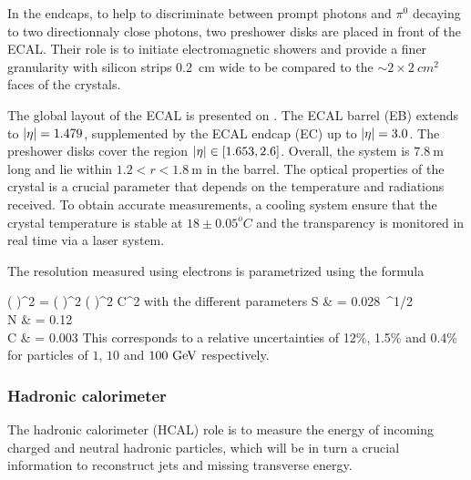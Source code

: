         In the endcaps, to help to discriminate between prompt photons and $\pi^0$ decaying
        to two directionnaly close photons, two preshower disks are placed in front of the
        ECAL. Their role is to initiate electromagnetic showers and provide a finer granularity
        with silicon strips 0.2~cm wide to be compared to the $\sim2\times2~cm^2$ faces
        of the crystals.


        The global layout of the ECAL is presented on . The ECAL
        barrel (EB) extends to $\left| \eta \right| = 1.479$, supplemented by the ECAL endcap (EC)
        up to $\left| \eta \right| = 3.0$. The preshower disks cover the region $\left| \eta \right| \in [1.653,2.6]$.
        Overall, the system is $7.8~\text{m}$ long and lie within $1.2 < r < 1.8~\text{m}$
        in the barrel.
        The optical properties of the crystal is a crucial parameter that depends on the
        temperature and radiations received. To obtain accurate measurements, a cooling
        system ensure that the crystal temperature is stable at $18\pm0.05^oC$ and the
        transparency is monitored in real time via a laser system.

        The resolution measured using electrons is parametrized using the formula

        {
            \left(  \right)^2
            =
            \left(  \right)^2
            \oplus
            \left(  \right)^2
            \oplus
            C^2
        }
        with the different parameters
        {
            S & = 0.028~^{1/2} \nonumber\\
            N & = 0.12~\\
            C & = 0.003\nonumber
        }
        This corresponds to a relative uncertainties of 12\%, 1.5\% and 0.4\% for particles
        of $1$, $10$ and $100~\text{GeV}$ respectively.

            \subsubsection{Hadronic calorimeter}

        The hadronic calorimeter (HCAL) role is to measure the energy of incoming charged
        and neutral hadronic particles, which will be in turn a crucial information to
        reconstruct jets and missing transverse energy.

